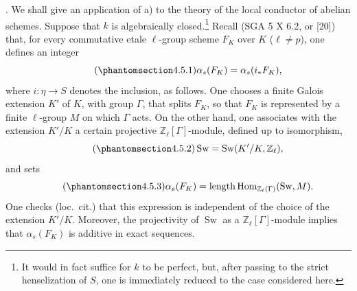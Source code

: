 
\medskip
\noindent
{}. We shall give an application of  a) to the theory of the local
conductor of abelian schemes.  Suppose that $k$ is algebraically
closed.\footnote{It would in fact suffice for $k$ to be perfect, but,
after passing to the strict henselization of $S$, one is immediately
reduced to the case considered here.}  Recall (SGA 5 X 6.2, or [20])
that, for every commutative etale $\ell$-group scheme $F_K$ over $K$
($\ell\neq p$), one defines an integer
\begin{equation}\tag{\SGARefTarget{sga7.sga7i.eix.n4-5-1}{4.5.1}}
 \alpha_s(F_K)=\alpha_s(i_*F_K),
\end{equation}
where $i:\eta\longrightarrow S$ denotes the inclusion, as follows.  One
chooses a finite Galois extension $K'$ of $K$, with group $\Gamma$,
that splits $F_K$, so that $F_K$ is represented by a finite
$\ell$-group $M$ on which $\Gamma$ acts.  On the other hand, one
associates with the extension $K'/K$ a certain projective
$\mathbb Z_\ell[\Gamma]$-module, defined up to isomorphism,
\begin{equation}\tag{\SGARefTarget{sga7.sga7i.eix.n4-5-2}{4.5.2}}
 \operatorname{Sw}=\operatorname{Sw}(K'/K,\mathbb Z_\ell),
\end{equation}
and sets
\begin{equation}\tag{\SGARefTarget{sga7.sga7i.eix.n4-5-3}{4.5.3}}
 \alpha_s(F_K)
 =\operatorname{length}
   \operatorname{Hom}_{\mathbb Z_\ell(\Gamma)}(\operatorname{Sw},M).
\end{equation}
One checks (loc.\ cit.) that this expression is independent of the
choice of the extension $K'/K$.  Moreover, the projectivity of
$\operatorname{Sw}$ as a $\mathbb Z_\ell[\Gamma]$-module implies that
$\alpha_s(F_K)$ is additive in exact sequences.

